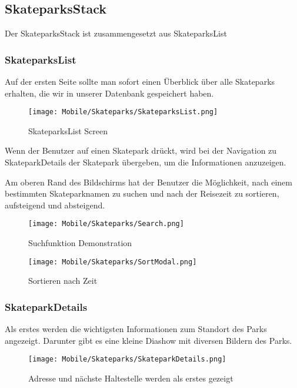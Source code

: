 \subsection{SkateparksStack}
Der SkateparksStack ist zusammengesetzt aus SkateparksList

\subsubsection{SkateparksList}
Auf der ersten Seite sollte man sofort einen Überblick über alle Skateparks erhalten, die wir in
unserer Datenbank gespeichert haben.

\begin{figure}[H]
  \begin{center}
    \texttt{[image: Mobile/Skateparks/SkateparksList.png]}
    \caption{SkateparksList Screen}
  \end{center}
\end{figure}

Wenn der Benutzer auf einen Skatepark drückt, wird bei der Navigation zu SkateparkDetails der
Skatepark übergeben, um die Informationen anzuzeigen.

Am oberen Rand des Bildschirms hat der Benutzer die Möglichkeit, nach einem bestimmten
Skateparknamen zu suchen und nach der Reisezeit zu sortieren, aufsteigend und absteigend.

\begin{figure}[H]
  \begin{center}
    \texttt{[image: Mobile/Skateparks/Search.png]}
    \caption{Suchfunktion Demonstration}
  \end{center}
\end{figure}

\begin{figure}[H]
  \begin{center}
    \texttt{[image: Mobile/Skateparks/SortModal.png]}
    \caption{Sortieren nach Zeit}
  \end{center}
\end{figure}

\subsubsection{SkateparkDetails}
Als erstes werden die wichtigsten Informationen zum Standort des Parks angezeigt. Darunter gibt es
eine kleine Diashow mit diversen Bildern des Parks.

\begin{figure}[H]
  \begin{center}
    \texttt{[image: Mobile/Skateparks/SkateparkDetails.png]}
    \caption{Adresse und nächste Haltestelle werden als erstes gezeigt}
  \end{center}
\end{figure}

